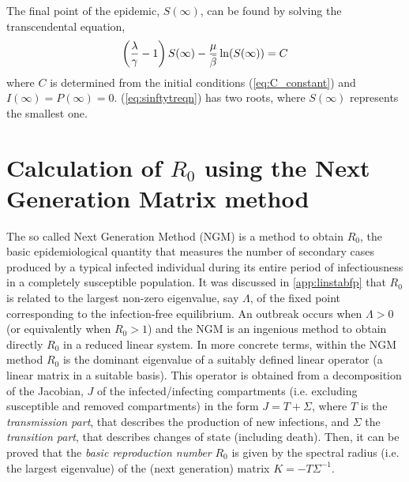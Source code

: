 The final point of the epidemic,  $S(\infty)$, can be found by solving the
transcendental equation,
\begin{equation}
    \left({{\lambda}\over{\gamma}}-1\right)S(\infty)
    -\frac{\mu}{\bar{\beta}}\ln (S(\infty))=C
    \label{eq:sinftytreqn}
\end{equation}
where $C$ is determined from the initial conditions (\cref{eq:C_constant})
and $I(\infty)=P(\infty)=0$.
(\cref{eq:sinftytreqn}) has two roots, where $S({\infty})$ represents the
smallest one.

\section{Calculation of $R_0$ using the Next Generation Matrix
  method}\label{app:NGM}

The so called Next Generation Method (NGM) is a method to obtain $R_0$, the
basic epidemiological quantity that measures the number of secondary cases
produced by a typical infected individual during its entire period of
infectiousness in a completely susceptible population. It was discussed in
\cref{app:linstabfp} that $R_0$ is related to the largest non-zero eigenvalue,
say $\Lambda$, of the fixed point corresponding to the infection-free
equilibrium. An outbreak occurs when $\Lambda>0$ (or equivalently when $R_0>1$)
and the NGM is an ingenious method to obtain directly $R_0$ in a reduced linear
system.
In more concrete terms, within the NGM method $R_0$ is the dominant eigenvalue
of a suitably defined linear operator (a linear matrix in a suitable basis).
This operator is obtained from a decomposition of the Jacobian, $J$ of
the infected/infecting compartments (i.e. excluding susceptible and removed
compartments) in the form $J=T+\Sigma$, where $T$ is
the
\textit{transmission part}, that describes the production of new infections,
and $\Sigma$  the \textit{transition part}, that describes changes of
state (including death). Then, it can be proved \cite{Diekmann2010} that the
\textit{basic reproduction number} $R_0$ is given by the spectral radius (i.e.
the largest eigenvalue) of the (next generation) matrix $K=- T
    \Sigma^{-1}$.

